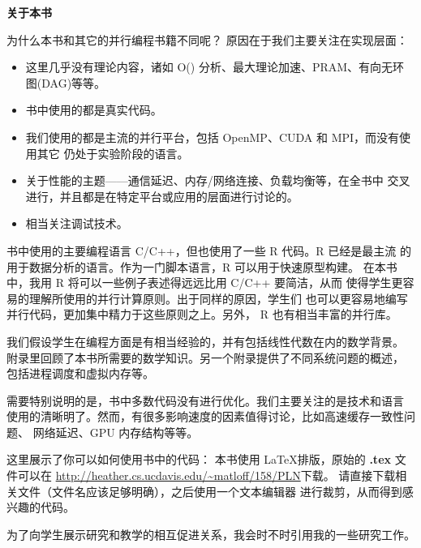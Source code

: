 ﻿%
\newpage

\begin{center}
{\bf \large 关于本书}
\end{center}

为什么本书和其它的并行编程书籍不同呢？
原因在于我们主要关注在实现层面：

\begin{itemize}

\item 这里几乎没有理论内容，诸如 O() 分析、最大理论加速、PRAM、有向无环图(DAG)等等。

\item 书中使用的都是真实代码。

\item 我们使用的都是主流的并行平台，包括 OpenMP、CUDA 和 MPI，而没有使用其它
仍处于实验阶段的语言。

\item 关于性能的主题——通信延迟、内存/网络连接、负载均衡等，在全书中
交叉进行，并且都是在特定平台或应用的层面进行讨论的。

\item 相当关注调试技术。

\end{itemize}

书中使用的主要编程语言 C/C++，但也使用了一些 R 代码。R 已经是最主流
的用于数据分析的语言。作为一门脚本语言，R 可以用于快速原型构建。
在本书中，我用 R 将可以一些例子表述得远远比用 C/C++ 要简洁，从而
使得学生更容易的理解所使用的并行计算原则。出于同样的原因，学生们
也可以更容易地编写并行代码，更加集中精力于这些原则之上。另外，
R 也有相当丰富的并行库。

我们假设学生在编程方面是有相当经验的，并有包括线性代数在内的数学背景。
附录里回顾了本书所需要的数学知识。另一个附录提供了不同系统问题的概述，
包括进程调度和虚拟内存等。

需要特别说明的是，书中多数代码没有进行优化。我们主要关注的是技术和语言
使用的清晰明了。然而，有很多影响速度的因素值得讨论，比如高速缓存一致性问题、
网络延迟、GPU 内存结构等等。

这里展示了你可以如何使用书中的代码：
本书使用 \LaTeX 排版，原始的 {\bf .tex} 文件可以在
\url{http://heather.cs.ucdavis.edu/~matloff/158/PLN}下载。
请直接下载相关文件（文件名应该足够明确），之后使用一个文本编辑器
进行裁剪，从而得到感兴趣的代码。

为了向学生展示研究和教学的相互促进关系，我会时不时引用我的一些研究工作。

